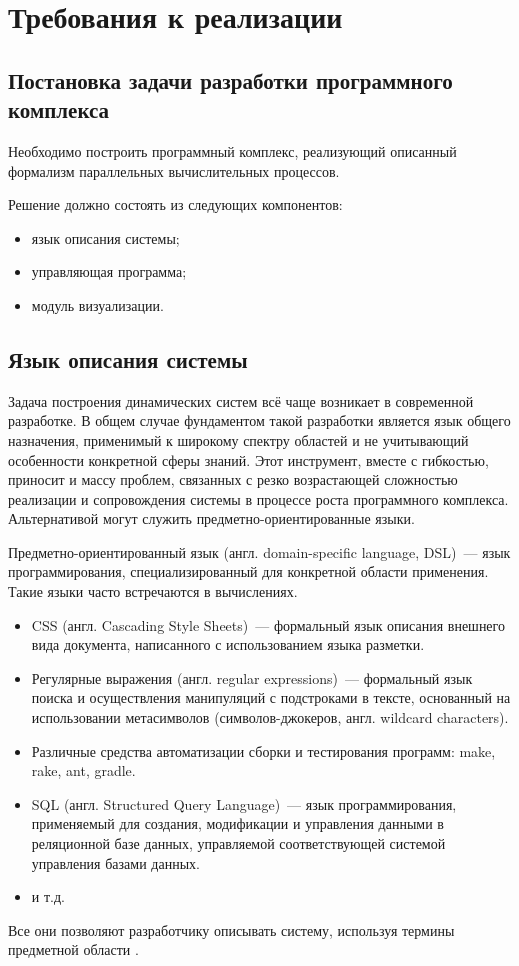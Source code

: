\chapter{Требования к реализации}
\section{Постановка задачи разработки программного комплекса}

Необходимо построить программный комплекс, реализующий описанный формализм параллельных вычислительных процессов.

Решение должно состоять из следующих компонентов:
\begin{itemize}
	\item язык описания системы;
	\item управляющая программа;
	\item модуль визуализации.
\end{itemize}


\section{Язык описания системы}
Задача построения динамических систем всё чаще возникает в современной разработке. 
В общем случае фундаментом такой разработки является язык общего назначения, применимый к широкому спектру областей и не учитывающий особенности конкретной сферы знаний\cite{berry1989real}.
Этот инструмент, вместе с гибкостью, приносит и массу проблем, связанных с резко возрастающей сложностью реализации и сопровождения системы в процессе роста программного комплекса.
Альтернативой могут служить предметно-ориентированные языки.

Предметно-ориентированный язык (англ. domain-specific language, DSL)~--- язык программирования, специализированный для конкретной области применения.
Такие языки часто встречаются в вычислениях.
\begin{itemize}
	\item CSS (англ. Cascading Style Sheets)~--- формальный язык описания внешнего вида документа, написанного с использованием языка разметки.
	\item Регулярные выражения (англ. regular expressions)~--- формальный язык поиска и осуществления манипуляций с подстроками в тексте, основанный на использовании метасимволов (символов-джокеров, англ. wildcard characters).
	\item Различные средства автоматизации сборки и тестирования программ: make, rake, ant, gradle.
	\item SQL (англ. Structured Query Language)~--- язык программирования, применяемый для создания, модификации и управления данными в реляционной базе данных, управляемой соответствующей системой управления базами данных.
	\item и т.д.
\end{itemize}
Все они позволяют разработчику описывать систему, используя термины предметной области \cite{van2000domain}.

